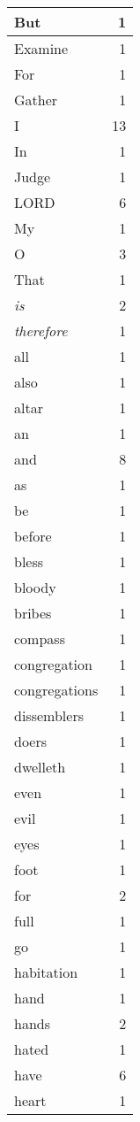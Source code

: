 \begin{center}
\begin{longtable}{l|r}
\hline \hline
\endlastfoot
But & 1 \\ \hline
Examine & 1 \\ \hline
For & 1 \\ \hline
Gather & 1 \\ \hline
I & 13 \\ \hline
In & 1 \\ \hline
Judge & 1 \\ \hline
LORD & 6 \\ \hline
My & 1 \\ \hline
O & 3 \\ \hline
That & 1 \\ \hline
\emph{is} & 2 \\ \hline
\emph{therefore} & 1 \\ \hline
all & 1 \\ \hline
also & 1 \\ \hline
altar & 1 \\ \hline
an & 1 \\ \hline
and & 8 \\ \hline
as & 1 \\ \hline
be & 1 \\ \hline
before & 1 \\ \hline
bless & 1 \\ \hline
bloody & 1 \\ \hline
bribes & 1 \\ \hline
compass & 1 \\ \hline
congregation & 1 \\ \hline
congregations & 1 \\ \hline
dissemblers & 1 \\ \hline
doers & 1 \\ \hline
dwelleth & 1 \\ \hline
even & 1 \\ \hline
evil & 1 \\ \hline
eyes & 1 \\ \hline
foot & 1 \\ \hline
for & 2 \\ \hline
full & 1 \\ \hline
go & 1 \\ \hline
habitation & 1 \\ \hline
hand & 1 \\ \hline
hands & 2 \\ \hline
hated & 1 \\ \hline
have & 6 \\ \hline
heart & 1 \\ \hline

\end{longtable}
\end{center}
